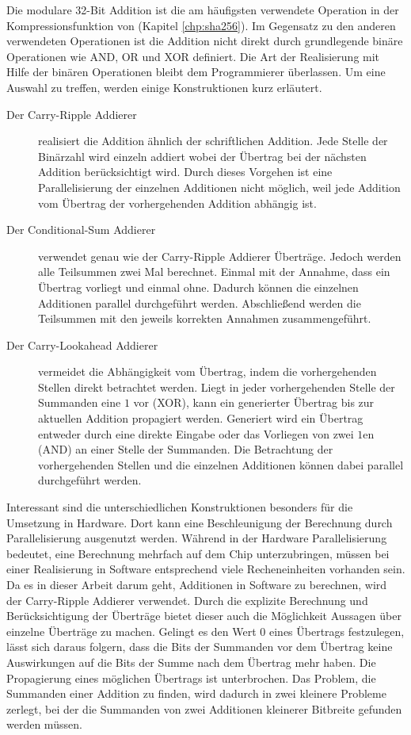 Die modulare 32-Bit Addition ist die am häufigsten verwendete Operation in der Kompressionsfunktion von  (Kapitel \ref{chp:sha256}).
Im Gegensatz zu den anderen verwendeten Operationen ist die Addition nicht direkt durch grundlegende binäre Operationen wie AND, OR und XOR definiert.
Die Art der Realisierung mit Hilfe der binären Operationen bleibt dem Programmierer überlassen. Um eine Auswahl zu treffen, werden einige Konstruktionen kurz erläutert.
\begin{description}
  \item[Der Carry-Ripple Addierer] realisiert die Addition ähnlich der schriftlichen Addition. Jede Stelle der Binärzahl wird einzeln addiert wobei der Übertrag bei der
                                   nächsten Addition berücksichtigt wird. Durch dieses Vorgehen ist eine Parallelisierung der einzelnen Additionen nicht möglich, weil jede
                                   Addition vom Übertrag der vorhergehenden Addition abhängig ist.
  \item[Der Conditional-Sum Addierer] verwendet genau wie der Carry-Ripple Addierer Überträge. Jedoch werden alle Teilsummen zwei Mal berechnet. Einmal mit der Annahme,
                                      dass ein Übertrag vorliegt und einmal ohne. Dadurch können die einzelnen Additionen parallel durchgeführt werden. Abschließend
                                      werden die Teilsummen mit den jeweils korrekten Annahmen zusammengeführt.
  \item[Der Carry-Lookahead Addierer] vermeidet die Abhängigkeit vom Übertrag, indem die vorhergehenden Stellen direkt betrachtet werden. Liegt in jeder vorhergehenden
                                      Stelle der Summanden eine $1$ vor (XOR), kann ein generierter Übertrag bis zur aktuellen Addition propagiert werden. Generiert wird
                                      ein Übertrag entweder durch eine direkte Eingabe oder das Vorliegen von zwei $1$en (AND) an einer Stelle der Summanden. Die Betrachtung
                                      der vorhergehenden Stellen und die einzelnen Additionen können dabei parallel durchgeführt werden.
\end{description}
Interessant sind die unterschiedlichen Konstruktionen besonders für die Umsetzung in Hardware. Dort kann eine Beschleunigung der Berechnung durch Parallelisierung
ausgenutzt werden. Während in der Hardware Parallelisierung bedeutet, eine Berechnung mehrfach auf dem Chip unterzubringen, müssen bei einer Realisierung in Software
entsprechend viele Recheneinheiten vorhanden sein. Da es in dieser Arbeit darum geht, Additionen in Software zu berechnen, wird der Carry-Ripple Addierer verwendet.
Durch die explizite Berechnung und Berücksichtigung der Überträge bietet dieser auch die Möglichkeit Aussagen über einzelne Überträge zu machen. Gelingt es den Wert $0$
eines Übertrags festzulegen, lässt sich daraus folgern, dass die Bits der Summanden vor dem Übertrag keine Auswirkungen auf die Bits der Summe nach dem Übertrag mehr haben.
Die Propagierung eines möglichen Übertrags ist unterbrochen. Das Problem, die Summanden einer Addition zu finden, wird dadurch in zwei kleinere Probleme zerlegt, bei der
die Summanden von zwei Additionen kleinerer Bitbreite gefunden werden müssen.

